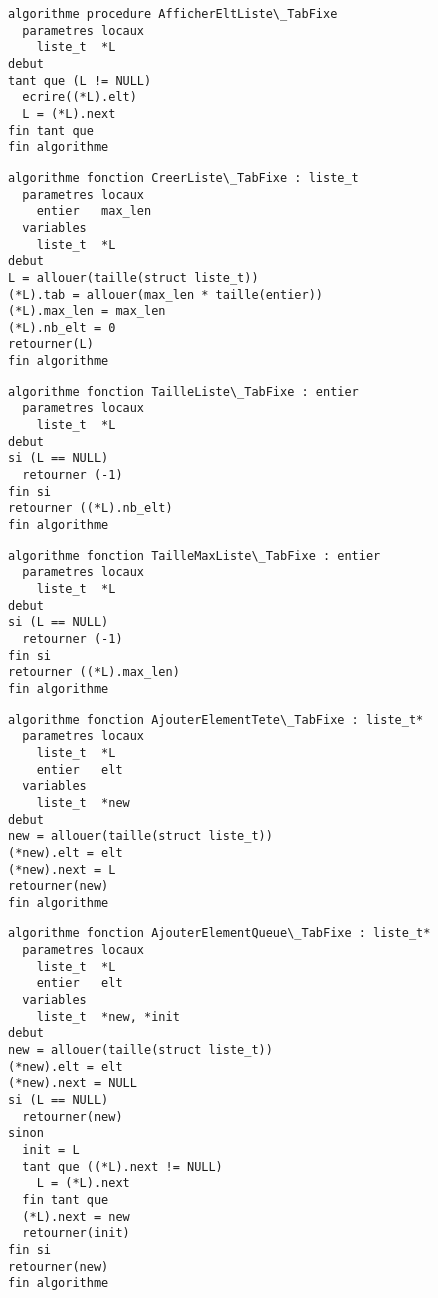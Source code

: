 \documentclass[11pt,a4paper]{article}
\begin{document}
\begin{center}
\begin{lstlisting}[style=algorithmique]
algorithme procedure AfficherEltListe\_TabFixe
  parametres locaux
    liste_t  *L
debut
tant que (L != NULL)
  ecrire((*L).elt)
  L = (*L).next
fin tant que
fin algorithme \end{lstlisting}
\end{center}


\begin{center}
\begin{lstlisting}[style=algorithmique]
algorithme fonction CreerListe\_TabFixe : liste_t
  parametres locaux
    entier   max_len
  variables
    liste_t  *L
debut
L = allouer(taille(struct liste_t))
(*L).tab = allouer(max_len * taille(entier))
(*L).max_len = max_len
(*L).nb_elt = 0
retourner(L)
fin algorithme \end{lstlisting}
\end{center}


\begin{center}
\begin{lstlisting}[style=algorithmique]
algorithme fonction TailleListe\_TabFixe : entier
  parametres locaux
    liste_t  *L
debut
si (L == NULL)
  retourner (-1)
fin si
retourner ((*L).nb_elt)
fin algorithme \end{lstlisting}
\end{center}


\begin{center}
\begin{lstlisting}[style=algorithmique]
algorithme fonction TailleMaxListe\_TabFixe : entier
  parametres locaux
    liste_t  *L
debut
si (L == NULL)
  retourner (-1)
fin si
retourner ((*L).max_len)
fin algorithme \end{lstlisting}
\end{center}


\begin{center}
\begin{lstlisting}[style=algorithmique]
algorithme fonction AjouterElementTete\_TabFixe : liste_t*
  parametres locaux
    liste_t  *L
    entier   elt
  variables
    liste_t  *new
debut
new = allouer(taille(struct liste_t))
(*new).elt = elt
(*new).next = L
retourner(new)
fin algorithme \end{lstlisting}
\end{center}


\begin{center}
\begin{lstlisting}[style=algorithmique]
algorithme fonction AjouterElementQueue\_TabFixe : liste_t*
  parametres locaux
    liste_t  *L
    entier   elt
  variables
    liste_t  *new, *init
debut
new = allouer(taille(struct liste_t))
(*new).elt = elt
(*new).next = NULL
si (L == NULL)
  retourner(new)
sinon
  init = L
  tant que ((*L).next != NULL)
    L = (*L).next
  fin tant que
  (*L).next = new
  retourner(init)
fin si
retourner(new)
fin algorithme \end{lstlisting}
\end{center}
\end{document}
